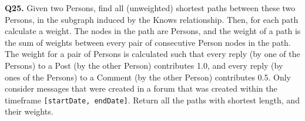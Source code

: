 \textbf{Q25.}
Given two Persons, find all (unweighted) shortest paths between these
two Persons, in the subgraph induced by the Knows relationship.
Then, for each path calculate a weight. The nodes in the path are
Persons, and the weight of a path is the sum of weights between every
pair of consecutive Person nodes in the path.
The weight for a pair of Persons is calculated such that every reply (by
one of the Persons) to a Post (by the other Person) contributes 1.0, and
every reply (by ones of the Persons) to a Comment (by the other Person)
contributes 0.5.
Only consider messages that were created in a forum that was created
within the timeframe \texttt{{[}startDate,\ endDate{]}}.
Return all the paths with shortest length, and their weights.
